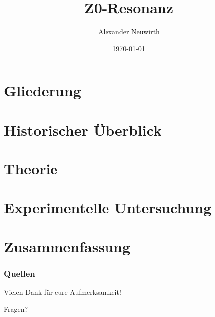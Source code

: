 \documentclass[german, ngerman,tikz]{beamer}
\title[Z0 Resonanz]{Z0-Resonanz} %
\author{Alexander Neuwirth}
\date{\today}
\begin{document}
\begin{frame}
	\titlepage
\end{frame}

\section*{Gliederung}
\begin{frame}
\frametitle{\secname}
\tableofcontents[hideallsubsections]
\end{frame}


\section{Historischer Überblick}


\section{Theorie}

\section{Experimentelle Untersuchung}


\section{Zusammenfassung}


\begin{frame}[allowframebreaks]
	\frametitle{Quellen}

	\printbibliography[heading=none]
\end{frame}

\begin{frame}
	\begin{block}{}
		\centering
		Vielen Dank für eure Aufmerksamkeit!
	\end{block}

	\begin{block}{}
		\centering
		Fragen?
	\end{block}

\end{frame}
\end{document}
